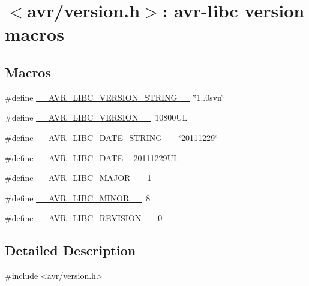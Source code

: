 \hypertarget{group__avr__version}{}\section{$<$avr/version.h$>$\+: avr-\/libc version macros}
\label{group__avr__version}
\subsection*{Macros}
\begin{DoxyCompactItemize}
\item 
\#define \hyperlink{group__avr__version_gaace584c6d368436814b4fe12d71230f9}{\+\_\+\+\_\+\+A\+V\+R\+\_\+\+L\+I\+B\+C\+\_\+\+V\+E\+R\+S\+I\+O\+N\+\_\+\+S\+T\+R\+I\+N\+G\+\_\+\+\_\+}~\char`\"{}1..\+0svn\char`\"{}
\item 
\#define \hyperlink{group__avr__version_ga161e98ee1c31a16eeb71fc87dc73526f}{\+\_\+\+\_\+\+A\+V\+R\+\_\+\+L\+I\+B\+C\+\_\+\+V\+E\+R\+S\+I\+O\+N\+\_\+\+\_\+}~10800\+UL
\item 
\#define \hyperlink{group__avr__version_gadecde61fc0ef6e31f4dd6c732913aba8}{\+\_\+\+\_\+\+A\+V\+R\+\_\+\+L\+I\+B\+C\+\_\+\+D\+A\+T\+E\+\_\+\+S\+T\+R\+I\+N\+G\+\_\+\+\_\+}~\char`\"{}20111229\char`\"{}
\item 
\#define \hyperlink{group__avr__version_ga09c3581176726e46963330ae12270bf6}{\+\_\+\+\_\+\+A\+V\+R\+\_\+\+L\+I\+B\+C\+\_\+\+D\+A\+T\+E\+\_\+}~20111229\+UL
\item 
\#define \hyperlink{group__avr__version_ga8a657f9b659536d9c0c3c03ca441bb00}{\+\_\+\+\_\+\+A\+V\+R\+\_\+\+L\+I\+B\+C\+\_\+\+M\+A\+J\+O\+R\+\_\+\+\_\+}~1
\item 
\#define \hyperlink{group__avr__version_gaaabd42be463ab59be357639b50bd722c}{\+\_\+\+\_\+\+A\+V\+R\+\_\+\+L\+I\+B\+C\+\_\+\+M\+I\+N\+O\+R\+\_\+\+\_\+}~8
\item 
\#define \hyperlink{group__avr__version_ga45476ad3a5db9be5a45d098bb1b093b1}{\+\_\+\+\_\+\+A\+V\+R\+\_\+\+L\+I\+B\+C\+\_\+\+R\+E\+V\+I\+S\+I\+O\+N\+\_\+\+\_\+}~0
\end{DoxyCompactItemize}


\subsection{Detailed Description}

\begin{DoxyCode}
\textcolor{preprocessor}{#include <avr/version.h>} 
\end{DoxyCode}


